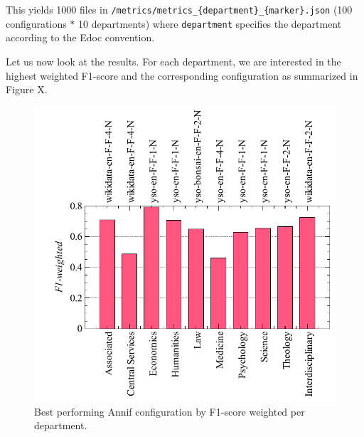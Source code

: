 \begin{Shaded}
\begin{Highlighting}[]
\OperatorTok{+} \OperatorTok{=}
\end{Highlighting}
\end{Shaded}

This yields 1000 files in
\texttt{/metrics/metrics\_\{department\}\_\{marker\}.json} (100
configurations \(*\) 10 departments) where \texttt{department} specifies
the department according to the Edoc convention.

Let us now look at the results. For each department, we are interested
in the highest weighted F1-score and the corresponding configuration as
summarized in Figure X.

\begin{figure}
\centering
\includegraphics{images/metrics_dept_summary.pdf}
\caption{Best performing Annif configuration by F1-score weighted per
department.}
\end{figure}

